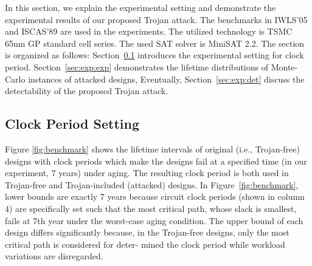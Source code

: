 In this section, we explain the experimental setting and demonstrate the experimental results of our proposed Trojan attack. The benchmarks in IWLS'05 and ISCAS'89 are used in the experiments. The utilized technology is TSMC 65nm GP standard cell series. The used SAT solver is MiniSAT 2.2. The section is organized as follows: Section~\ref{sec:exp:tc} introduces the experimental setting for clock period. Section~\ref{sec:exp:exp} demonstrates the lifetime distributions of Monte-Carlo instances of attacked designs, Eventually, Section~\ref{sec:exp:det} discuss the detectability of the proposed Trojan attack.  

\subsection{Clock Period Setting}
\label{sec:exp:tc}
Figure \ref{fig:benchmark} shows the lifetime intervals of original (i.e., Trojan-free) designs with clock periods which make the designs fail at a specified time (in our experiment, 7 years) under aging. The resulting clock period is both used in Trojan-free and Trojan-included (attacked) designs. In Figure~\ref{fig:benchmark}, lower bounds are exactly 7 years because circuit clock periods (shown in column 4) are specifically set such that the most critical path, whose slack is smallest, fails at 7th year under the worst-case aging condition. The upper bound of each design differs significantly because, in the Trojan-free designs, only the most critical path is considered for deter- mined the clock period while workload variations are disregarded.



